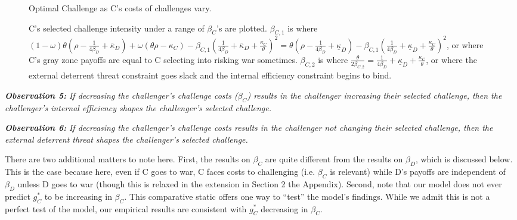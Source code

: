 \documentclass[11pt,letterpaper,pdftex,dvipsnames,table]{article}
\begin{document}
\begin{figure}[h]
 \caption{Optimal Challenge as C's costs of challenges vary.}
\caption*{C's selected challenge intensity under a range of $\beta_{C}$'s are plotted. $\beta_{C,1}$ is where $(1-\omega)\theta\left(\rho-\frac{1}{4\beta_{D}}+\bar{\kappa}_{D}\right)+\omega\left(\theta\rho-\kappa_{C}\right)-\beta_{C,1}\left(\frac{1}{4\beta_{D}}+\bar{\kappa}_{D}+\frac{\kappa_{C}}{\theta}\right)^{2}=\theta\left(\rho-\frac{1}{4\beta_{D}}+\underline{\kappa}_{D}\right)-\beta_{C,1}\left(\frac{1}{4\beta_{D}}+\underline{\kappa}_{D}+\frac{\kappa_{C}}{\theta}\right)^{2}$, or where C's gray zone payoffs are equal to C selecting into risking war sometimes. $\beta_{C,2}$ is where $\frac{\theta}{2\beta_{C,2}}=\frac{1}{4\beta_{D}}+\underline{\kappa}_{D}+\frac{\kappa_{C}}{\theta}$, or where the external deterrent threat constraint goes slack and the internal efficiency constraint begins to bind.}
\label{fig:optimalcostvary}
\end{figure}

\textbf{\textit{Observation 5:}}\textit{ If decreasing the challenger's challenge costs ($\beta_{C}$) results in the challenger increasing their selected challenge, then the challenger's internal efficiency shapes the challenger's selected challenge. }

\textbf{\textit{Observation 6:}}\textit{ If decreasing the challenger's challenge costs results in the challenger not changing their selected challenge, then the external deterrent threat shapes the challenger's selected challenge. }

There are two additional matters to note here. First, the results on $\beta_{C}$ are quite different from the results on $\beta_{D}$, which is discussed below. This is the case because here, even if C goes to war, C faces costs to challenging (i.e. $\beta_{C}$ is relevant) while D's payoffs are independent of $\beta_{D}$ unless D goes to war (though this is relaxed in the extension in Section 2 the Appendix). Second, note that our model does not ever predict $g_{C}^{*}$ to be increasing in $\beta_{C}$. This comparative static offers one way to ``test'' the model's findings. While we admit this is not a perfect test of the model, our empirical results are consistent with $g_{C}^{*}$ decreasing in $\beta_{C}$. 
\end{document}
